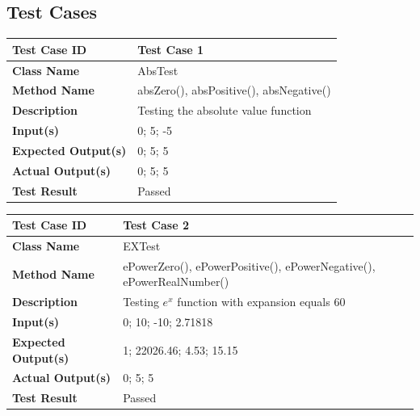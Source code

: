 \documentclass[11pt]{article}
\begin{document}
\subsection{Test Cases}
\begin{center}
    \begin{tabular}{|p{4cm}|p{11cm}| }
    \hline
    \textbf{Test Case ID} & Test Case 1\\ \hline 
    \textbf{Class Name} &  AbsTest\\ \hline 
    \textbf{Method Name} & absZero(), absPositive(), absNegative()\\ \hline 
    \textbf{Description} & Testing the absolute value function\\ \hline
    \textbf{Input(s)} & 0; 5; -5\\ \hline
    \textbf{Expected Output(s)} & 0; 5; 5\\ \hline
    \textbf{Actual Output(s)} & 0; 5; 5\\ \hline
    \textbf{Test Result} & Passed\\ \hline
\end{tabular}
\end{center}

\begin{center}
    \begin{tabular}{|p{4cm}|p{11cm}| }
    \hline
    \textbf{Test Case ID} & Test Case 2\\ \hline 
    \textbf{Class Name} &  EXTest\\ \hline 
    \textbf{Method Name} & ePowerZero(), ePowerPositive(), ePowerNegative(),  ePowerRealNumber() \\ \hline 
    \textbf{Description} & Testing $e^x$ function with expansion equals 60\\ \hline
    \textbf{Input(s)} & 0; 10; -10; 2.71818\\ \hline
    \textbf{Expected Output(s)} & 1; 22026.46; 4.53; 15.15\\ \hline
    \textbf{Actual Output(s)} & 0; 5; 5\\ \hline
    \textbf{Test Result} & Passed\\ \hline
\end{tabular}
\end{center}
\end{document}
